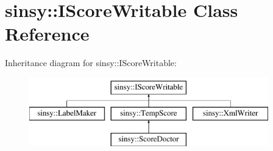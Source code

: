 \hypertarget{classsinsy_1_1IScoreWritable}{\section{sinsy\-:\-:\-I\-Score\-Writable \-Class \-Reference}
\label{classsinsy_1_1IScoreWritable}
}
\-Inheritance diagram for sinsy\-:\-:\-I\-Score\-Writable\-:\begin{figure}[H]
\begin{center}
\leavevmode
\includegraphics[height=3.000000cm]{classsinsy_1_1IScoreWritable}
\end{center}
\end{figure}

